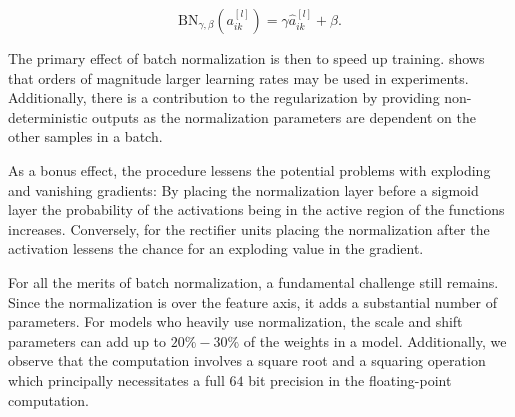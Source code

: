 \begin{equation}\label{eq:bn}
\text{BN}_{\gamma, \beta}(a_{ik}^{[l]}) = \gamma  \hat{a}_{ik}^{[l]} + \beta.
\end{equation} 

\noindent The primary effect of batch normalization is then to speed up training. \cite{Ioffe2015} shows that orders of magnitude larger learning rates may be used in experiments. Additionally, there is a contribution to the regularization by providing non-deterministic outputs as the normalization parameters are dependent on the other samples in a batch. 

As a bonus effect, the procedure lessens the potential problems with exploding and vanishing gradients: By placing the normalization layer before a sigmoid layer the probability of the activations being in the active region of the functions increases. Conversely, for the rectifier units placing the normalization after the activation lessens the chance for an exploding value in the gradient.

For all the merits of batch normalization, a fundamental challenge still remains. Since the normalization is over the feature axis, it adds a substantial number of parameters. For models who heavily use normalization, the scale and shift parameters can add up to $20\%-30\%$ of the weights in a model. Additionally, we observe that the computation involves a square root and a squaring operation which principally necessitates a full $64$ bit precision in the floating-point computation. 